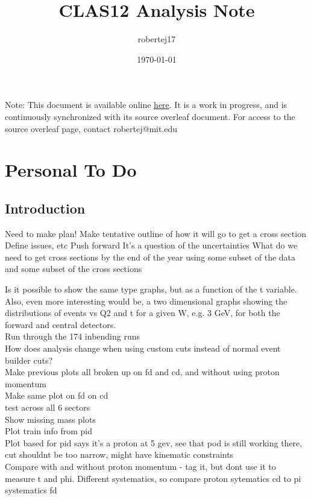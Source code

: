 \documentclass[oneside]{book}
\title{CLAS12 \DVEP Analysis Note}
\author{robertej17 }
\date{\today}
\begin{document}
\maketitle
Note: This document is available online \href{http://www.lns.mit.edu/~robertej/CLAS12/CLAS12DVPiPAnalysisNote.pdf}{here}. It is a work in progress, and is continuously synchronized with its source overleaf document. For access to the source overleaf page, contact robertej@mit.edu


\chapter{Personal To Do}

\section{Introduction}
Need to make plan!
Make tentative outline of how it will go to get a cross section
Define issues, etc
Push forward
It’s a question of the uncertainties 
What do we need to get cross sections by the end of the year using some subset of the data and some subset of the cross sections

Is it possible to show the same type graphs, but as a function of the t variable. Also, even more interesting would be, a two dimensional graphs  showing the distributions of events vs Q2 and t  for a given W, e.g. 3 GeV, for both the forward and central detectors.\\

Run through the 174 inbending runs\\

How does analysis change when using custom cuts instead of normal event builder cuts?\\


Make previous plots all broken up on fd and cd, and without using proton momentum\\

Make same plot on fd on cd \\
test across all 6 sectors\\
Show missing mass plots\\
Plot train info from pid\\

Plot based for pid says it's a proton at 5 gev, see that pod is still working there, cut shouldnt be too narrow, might have kinematic constraints\\

Compare with and without proton momentum - tag it, but dont use it to measure t and phi. Different systematics, so compare proton sytematics cd to pi systematics fd\\
\end{document}
